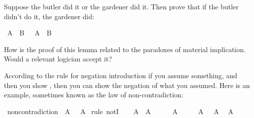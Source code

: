 \begin{isabellebody}
\begin{isamarkuptext}%
\begin{Exercise} Suppose the butler did it or the gardener did it. Then prove that if the butler didn't do it, 
the gardener did: \end{Exercise}%
\end{isamarkuptext}\isamarkuptrue%
\isamarkupfalse%
\ {\isachardoublequoteopen}A\ {\isasymor}\ B\ {\isasymlongrightarrow}\ {\isasymnot}\ A\ {\isasymlongrightarrow}\ B{\isachardoublequoteclose}%
\isadelimproof
\ %
\endisadelimproof
%
\isatagproof
{}\isamarkupfalse%
%
\endisatagproof
{\isafoldproof}%
%
\isadelimproof
%
\endisadelimproof
%
\begin{isamarkuptext}%
How is the proof of this lemma related to the paradoxes of material implication. Would a
relevant logician accept it?%
\end{isamarkuptext}\isamarkuptrue%
%
\isadelimdocument
%
\endisadelimdocument
%
\isatagdocument
%
\isamarkuptrue%
%
\endisatagdocument
{\isafolddocument}%
%
\isadelimdocument
%
\endisadelimdocument
%
\begin{isamarkuptext}%
According to the rule for negation introduction if you assume something, and then you show
, then you can show the negation of what you assumed. Here is an example, sometimes
known as the law of non-contradiction:%
\end{isamarkuptext}\isamarkuptrue%
\isamarkupfalse%
\ non{\isacharunderscore}contradiction{\isacharcolon}\ {\isachardoublequoteopen}{\isasymnot}\ {\isacharparenleft}A\ {\isasymand}\ {\isasymnot}\ A{\isacharparenright}{\isachardoublequoteclose}\isanewline
%
\isadelimproof
%
\endisadelimproof
%
\isatagproof
{}\isamarkupfalse%
\ {\isacharparenleft}rule\ notI{\isacharparenright}\isanewline
\ \ \isamarkupfalse%
\ {\isachardoublequoteopen}A\ {\isasymand}\ {\isasymnot}A{\isachardoublequoteclose}\isanewline
\ \ \isamarkupfalse%
\ {\isachardoublequoteopen}\ {\isasymnot}\ A{\isachardoublequoteclose}\isacommand{{\isachardot}{\isachardot}}\isamarkupfalse%
\isanewline
\ \ \isamarkupfalse%
\ \isamarkupfalse%
\ {\isacharbackquoteopen}A\ {\isasymand}\ {\isasymnot}\ A{\isacharbackquoteclose}\ \isamarkupfalse%
\ {\isachardoublequoteopen}A{\isachardoublequoteclose}\isacommand{{\isachardot}{\isachardot}}\isamarkupfalse%
\isanewline
\ \ \isamarkupfalse%
\ \isamarkupfalse%

\end{isabellebody}
